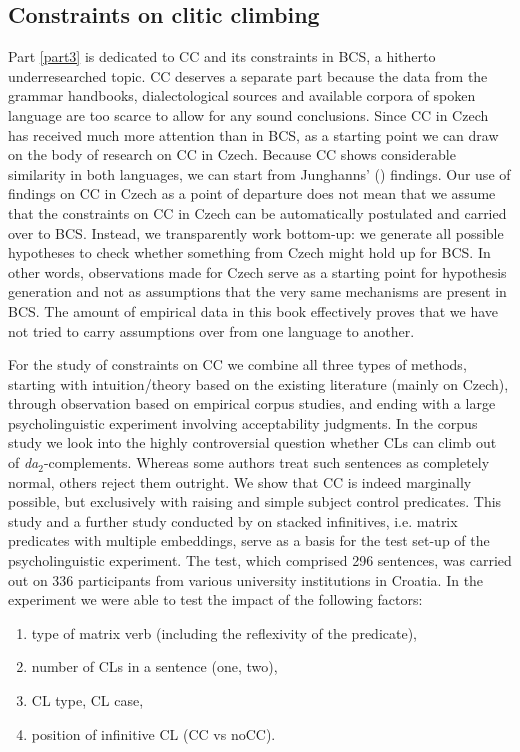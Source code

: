 \subsection{Constraints on clitic climbing}

Part \ref{part3} is dedicated to CC and its constraints in BCS, a hitherto underresearched topic. CC deserves a separate part because the data from the grammar handbooks, dialectological sources and available corpora of spoken language are too scarce to allow for any sound conclusions. Since CC in Czech has received much more attention than in BCS, as a starting point we can draw on the body of research on CC in Czech. Because CC shows considerable similarity in both languages, we can start from Junghanns' (\citeyear{Junghanns02}) findings. Our use of findings on CC in Czech as a point of departure does not mean that we assume that the constraints on CC in Czech can be automatically postulated and carried over to BCS. Instead, we transparently work bottom-up: we generate all possible hypotheses to check whether something from Czech might hold up for BCS. In other words, observations made for Czech serve as a starting point for hypothesis generation and not as assumptions that the very same mechanisms are present in BCS. The amount of empirical data in this book effectively proves that we have not tried to carry assumptions over from one language to another.

For the study of constraints on CC we combine all three types of methods, starting with intuition/theory based on the existing literature (mainly on Czech), through observation based on empirical corpus studies, and ending with a large psycholinguistic experiment involving acceptability judgments. In the corpus study we look into the highly controversial question whether CLs can climb out of \textit{da}$_2$-complements. Whereas some authors treat such sentences as completely normal, others reject them outright. We show that CC is indeed marginally possible, but exclusively with raising and simple subject control predicates. This study and a further study conducted by \citet*{HKJ18} on stacked infinitives, i.e. matrix predicates with multiple embeddings, serve as a basis for the test set-up of the psycholinguistic experiment. The test, which comprised 296 sentences, was carried out on 336 participants from various university institutions in Croatia. In the experiment we were able to test the impact of the following factors:

\largerpage[-1]

\begin{enumerate}
	\item type of matrix verb (including the reflexivity of the predicate),
	\item number of CLs in a sentence (one, two),
	\item CL type, CL case,
	\item position of infinitive CL (CC vs noCC).
\end{enumerate}  


